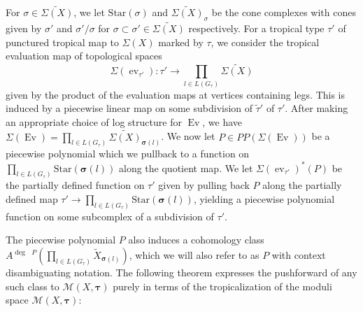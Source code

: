 \documentclass[12pt, oneside]{amsart}   	%
\newcommand{\NN}{\mathbb{N}}
\newcommand{\ev}{\operatorname{ev}}
\newcommand{\Ev}{\operatorname{Ev}}
\numberwithin{equation}{section}
\numberwithin{thm}{section}
\numberwithin{figure}{section}
\begin{document}
For $\sigma \in \widetilde{\Sigma(X)}$, we let $\text{Star}(\sigma)$ and $\widetilde{\Sigma(X)}_{\sigma}$ be the cone complexes with cones given by $\sigma'$ and $\sigma'/\sigma$ for $\sigma \subset \sigma' \in \widetilde{\Sigma(X)}$ respectively. For a tropical type $\tau'$ of punctured tropical map to $\Sigma(X)$ marked by $\tau$, we consider the tropical evaluation map of topological spaces 
$$\Sigma(\ev_{\tau'}): \tau' \rightarrow \prod_{l \in L(G_{\tau})} \widetilde{\Sigma(X)}$$
given by the product of the evaluation maps at vertices containing legs. This is induced by a piecewise linear map on some subdivision of $\widetilde{\tau}'$ of $\tau'$. After making an appropriate choice of log structure for $\Ev$, we have $\Sigma(\Ev) = \prod_{l \in L(G_{\tau})} \widetilde{\Sigma(X)}_{\pmb\sigma(l)}$. We now let $P\in PP(\Sigma(\Ev))$ be a piecewise polynomial which we pullback to a function on $\prod_{l \in L(G_{\tau})} \text{Star}(\pmb\sigma(l))$ along the quotient map. We let $\Sigma(\ev_{\tau'})^*(P)$ be the partially defined function on $\tau'$ given by pulling back $P$ along the partially defined map $\tau' \rightarrow \prod_{l \in L(G_{\tau})} \text{Star}(\pmb\sigma(l))$, yielding a piecewise polynomial function on some subcomplex of a subdivision of $\tau'$. 

 The piecewise polynomial $P$ also induces a cohomology class $A^{\deg\text{ }P}(\prod_{l \in L(G_{\tau})}\widetilde{X}_{\pmb\sigma(l)})$, which we will also refer to as $P$ with context disambiguating notation. The following theorem expresses the pushforward of any such class to $\mathscr{M}(X,\pmb\tau)$ purely in terms of the tropicalization of the moduli space $\mathscr{M}(X,\pmb\tau)$:



\end{document}
